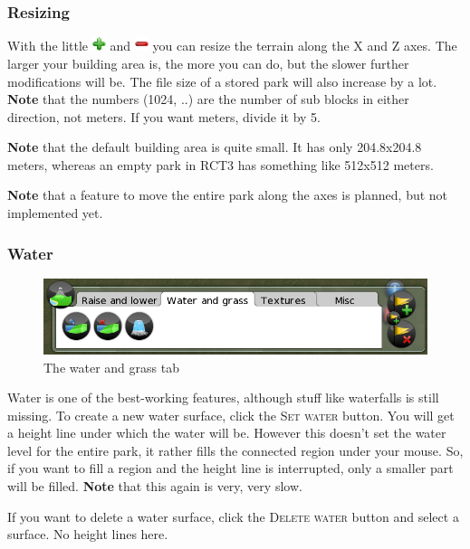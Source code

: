 \documentclass[a4paper]{article}
\newcommand{\ccaption}[1]{\textsc{#1}}
\newcommand{\note}[1]{\textbf{Note} #1 \par}
\begin{document}
\subsubsection{Resizing}
With the little \includegraphics[width=4mm]{../images/list-add.png} and \includegraphics[width=4mm]{../images/list-remove.png} you can resize
the terrain along the X and Z axes. The larger your building area is, the more you can do, but the slower further modifications will be. The
file size of a stored park will also increase by a lot.
\note{that the numbers (1024, ..) are the number of sub blocks in either direction, not meters. If you want meters, divide it by 5.}
\note{that the default building area is quite small. It has only 204.8x204.8 meters, whereas an empty park in RCT3 has something like
512x512 meters.}
\note{that a feature to move the entire park along the axes is planned, but not implemented yet.}

\subsubsection{Water}

\begin{figure}[h]
  \begin{center}
    \includegraphics[width=140mm]{./images/terrain-02.png}
  \end{center}
  \caption{The water and grass tab}
\end{figure}

Water is one of the best-working features, although stuff like waterfalls is still missing. To create a new water surface,
click the \ccaption{Set water} button. You will get a height line under which the water will be. However this doesn't set the water level for the
entire park, it rather fills the connected region under your mouse. So, if you want to fill a region and the height line is interrupted,
only a smaller part will be filled.
\note{that this again is very, very slow.}

If you want to delete a water surface, click the \ccaption{Delete water} button and select a surface. No height lines here.
\end{document}
